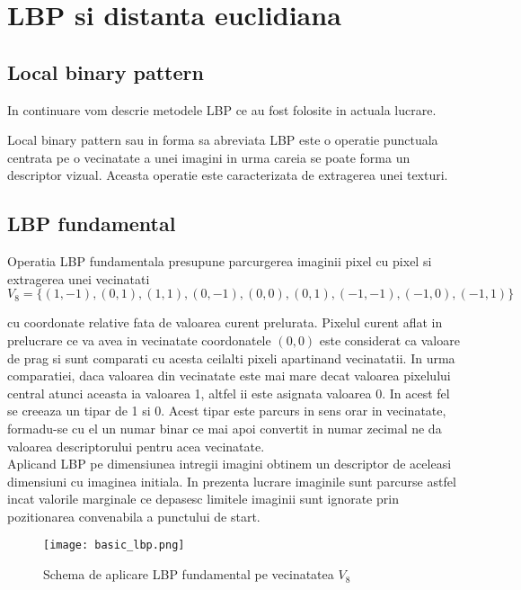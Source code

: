 \section{LBP si distanta euclidiana}

\subsection{Local binary pattern}

\quad In continuare vom descrie metodele LBP ce au fost folosite in
actuala lucrare.

\quad Local binary pattern sau in forma sa abreviata LBP este o operatie punctuala centrata  
pe o vecinatate a unei imagini in urma careia se poate forma un descriptor vizual. Aceasta 
operatie este caracterizata de extragerea unei texturi.


\subsection{LBP fundamental}

\quad Operatia LBP fundamentala presupune parcurgerea imaginii pixel cu pixel si extragerea 
unei vecinatati 
\[
V_8 = \{ (1,-1), (0,1), (1,1), (0,-1), (0,0), (0,1),(-1,-1), (-1,0), (-1,1) \}	
\]

cu coordonate relative fata de valoarea curent prelurata. Pixelul curent aflat in prelucrare ce va avea in vecinatate coordonatele 
$(0,0)$ este considerat ca valoare de prag si sunt comparati cu acesta
ceilalti pixeli apartinand vecinatatii. In urma comparatiei, daca valoarea din vecinatate este mai mare decat valoarea pixelului central 
atunci aceasta ia valoarea 1, altfel ii este asignata valoarea 0. In
acest fel se creeaza un tipar de 1 si 0. Acest tipar este parcurs in sens orar in vecinatate, formadu-se cu el un numar binar ce mai apoi convertit in numar zecimal ne da valoarea descriptorului pentru acea 
vecinatate. \\
\null \quad Aplicand LBP pe dimensiunea intregii imagini obtinem un descriptor
de aceleasi dimensiuni cu imaginea initiala. In prezenta lucrare 
imaginile sunt parcurse astfel incat valorile marginale ce depasesc
limitele imaginii sunt ignorate prin pozitionarea convenabila a 
punctului de start. \\

\begin{figure}[h]
	\texttt{[image: basic\_lbp.png]}
	\centering
	\caption{Schema de aplicare LBP fundamental pe vecinatatea $V_8$}
\end{figure}


